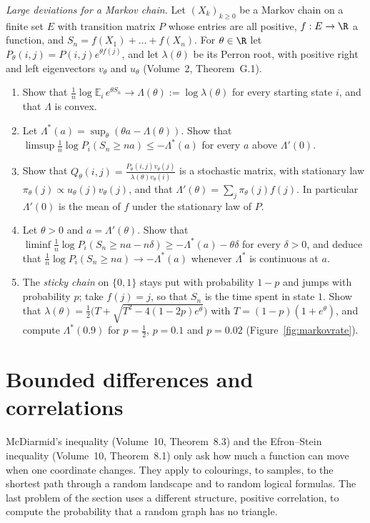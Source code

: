 \begin{exercise}[Journey]\label{pb:markovld}
\emph{Large deviations for a Markov chain.} Let $(X_k)_{k\ge0}$ be a Markov chain on a finite set $E$ with transition matrix $P$ whose entries are all positive, $f:E\to\R$ a
function, and $S_n=f(X_1)+\dots+f(X_n)$. For $\theta\in\R$ let $P_\theta(i,j)=P(i,j)e^{\theta f(j)}$, and let $\lambda(\theta)$ be its Perron root, with positive right and left
eigenvectors $v_\theta$ and $u_\theta$ (Volume~2, Theorem~G.1).
\begin{enumerate}[label=(\alph*)]
\item Show that $\frac1n\log\mathbb E_i\,e^{\theta S_n}\to\Lambda(\theta):=\log\lambda(\theta)$ for every starting state $i$, and that $\Lambda$ is convex.
\item Let $\Lambda^*(a)=\sup_\theta(\theta a-\Lambda(\theta))$. Show that $\limsup\frac1n\log P_i(S_n\ge na)\le-\Lambda^*(a)$ for every $a$ above $\Lambda'(0)$.
\item Show that $Q_\theta(i,j)=\frac{P_\theta(i,j)v_\theta(j)}{\lambda(\theta)v_\theta(i)}$ is a stochastic matrix, with stationary law $\pi_\theta(j)\propto u_\theta(j)v_\theta(j)$, and that
$\Lambda'(\theta)=\sum_j\pi_\theta(j)f(j)$. In particular $\Lambda'(0)$ is the mean of $f$ under the stationary law of $P$.
\item Let $\theta>0$ and $a=\Lambda'(\theta)$. Show that $\liminf\frac1n\log P_i(S_n\ge na-n\delta)\ge-\Lambda^*(a)-\theta\delta$ for every $\delta>0$, and deduce that
$\frac1n\log P_i(S_n\ge na)\to-\Lambda^*(a)$ whenever $\Lambda^*$ is continuous at $a$.
\item The \emph{sticky chain} on $\{0,1\}$ stays put with probability $1-p$ and jumps with probability $p$; take $f(j)=j$, so that $S_n$ is the time spent in state $1$. Show
that $\lambda(\theta)=\frac12\bigl(T+\sqrt{T^2-4(1-2p)e^\theta}\bigr)$ with $T=(1-p)(1+e^\theta)$, and compute $\Lambda^*(0.9)$ for $p=\frac12$, $p=0.1$ and $p=0.02$
(Figure~\ref{fig:markovrate}).
\end{enumerate}
\end{exercise}

\section{Bounded differences and correlations}

McDiarmid's inequality (Volume~10, Theorem~8.3) and the Efron--Stein inequality (Volume~10, Theorem~8.1) only ask how much a function can move when one coordinate changes.
They apply to colourings, to samples, to the shortest path through a random landscape and to random logical formulas. The last problem of the section uses a
different structure, positive correlation, to compute the probability that a random graph has no triangle.

